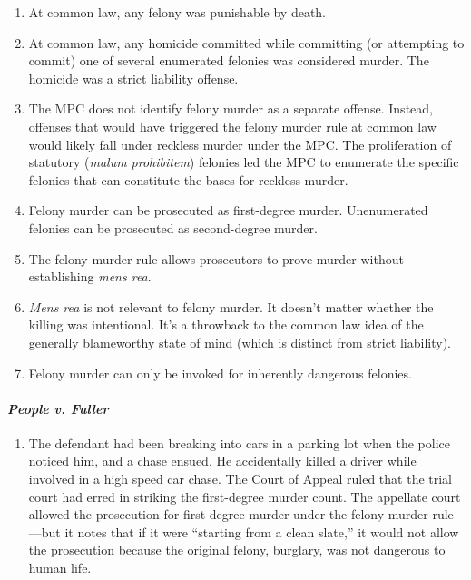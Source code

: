 \begin{enumerate}
    \item At common law, any felony was punishable by death.
    \item At common law, any homicide committed while committing (or attempting to commit) one of several enumerated felonies was considered murder. The homicide was a strict liability offense.
    \item The MPC does not identify felony murder as a separate offense. Instead, offenses that would have triggered the felony murder rule at common law would likely fall under reckless murder under the MPC. The proliferation of statutory (\emph{malum prohibitem}) felonies led the MPC to enumerate the specific felonies that can constitute the bases for reckless murder.
    \item Felony murder can be prosecuted as first-degree murder. Unenumerated felonies can be prosecuted as second-degree murder.
    \item The felony murder rule allows prosecutors to prove murder without establishing \emph{mens rea}.
    \item \emph{Mens rea} is not relevant to felony murder. It doesn't matter whether the killing was intentional. It's a throwback to the common law idea of the generally blameworthy state of mind (which is distinct from strict liability).
    \item Felony murder can only be invoked for inherently dangerous felonies. %
\end{enumerate}

\paragraph{\emph{People v. Fuller}} 

\begin{enumerate}
    \item The defendant had been breaking into cars in a parking lot when the police noticed him, and a chase ensued. He accidentally killed a driver while involved in a high speed car chase. The Court of Appeal ruled that the trial court had erred in striking the first-degree murder count. The appellate court allowed the prosecution for first degree murder under the felony murder rule---but it notes that if it were ``starting from a clean slate,'' it would not allow the prosecution because the original felony, burglary, was not dangerous to human life.
\end{enumerate}

